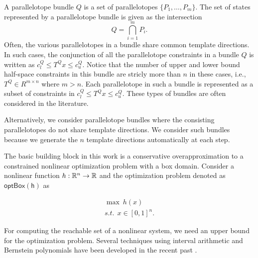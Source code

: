 A parallelotope bundle $Q$ is a set of parallelotopes $\{P_1, \ldots, P_m\}$.
%
The set of states represented by a parallelotope bundle is given as the intersection
\begin{equation}
Q = \bigcap_{i=1}^m P_i.
\end{equation}
%
Often, the various parallelotopes in a bundle share common template directions.
%
In such cases, the conjunction of all the parallelotope constraints in a bundle $Q$ is written as $c_{l}^Q \leq T^Q x \leq c_{u}^Q$.
%
Notice that the number of upper and lower bound half-space constraints in this bundle are stricly more than $n$ in these cases, i.e., $T^Q \in R^{m \times n}$ where $m>n$.
%
Each parallelotope in such a bundle is represented as a subset of constraints in $c_{l}^Q \leq T^Q x \leq c_{u}^Q$.
%
These types of bundles are often considered in the literature. \cite{dang2009image,dang2012reachability,dreossi2017reachability}


Alternatively, we consider parallelotope bundles where the consisting parallelotopes do not share template directions.
%
We consider such bundles because we generate the $n$ template directions automatically at each step.
%



The basic building block in this work is a conservative overapproximation to a constrained nonlinear optimization problem with a box domain.
%
Consider a nonlinear function $h : \reals^n \rightarrow \reals$ and the optimization problem denoted as $\mathsf{optBox(h)}$ as

\begin{eqnarray}
  \max ~ h(x) \label{eq:maxsup}\\
  s.t. ~~ x \in [0,1]^{n}.\nonumber
\end{eqnarray}

For computing the reachable set of a nonlinear system, we need an upper bound for the optimization problem.
%
Several techniques using interval arithmetic and Bernstein polynomials have been developed in the recent past \newline\cite{kodiak,garloff2003bernstein,munoz2013formalization,smith2009fast}.
%
